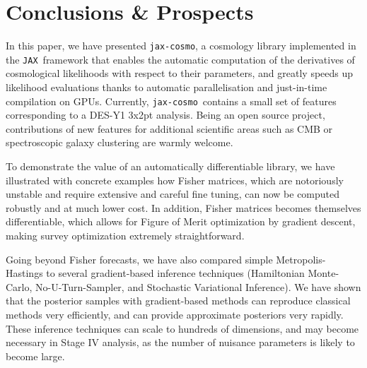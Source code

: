 \documentclass[twocolumn,twocolappendix,nofootinbib,iop]{openjournal}
\newcommand{\jaxcosmo}{\texttt{jax-cosmo}}
\newcommand{\jax}{\texttt{JAX}}
\begin{document}
\section{Conclusions \& Prospects}
\label{sec-conclusion}

In this paper, we have presented \jaxcosmo, a cosmology library implemented in the \jax\ framework that enables the automatic computation of the derivatives of cosmological likelihoods with respect to their parameters, and greatly speeds up likelihood evaluations thanks to automatic parallelisation and just-in-time compilation on GPUs. Currently, \jaxcosmo\ contains a small set of features corresponding to a DES-Y1 3x2pt analysis. Being an open source project, contributions of new features for additional scientific areas such as CMB or spectroscopic galaxy clustering are warmly welcome. 

To demonstrate the value of an automatically differentiable library, we have illustrated with concrete examples how Fisher matrices, which are notoriously unstable and require extensive and careful fine tuning, can now be computed robustly and at much lower cost. In addition, Fisher matrices becomes themselves differentiable, which allows for  Figure of Merit optimization by gradient descent, making survey optimization extremely straightforward. 

Going beyond Fisher forecasts, we have also compared simple Metropolis-Hastings to several gradient-based inference techniques (Hamiltonian Monte-Carlo, No-U-Turn-Sampler, and Stochastic Variational Inference). We have shown that the posterior samples with gradient-based methods can reproduce classical methods very efficiently, and can provide approximate posteriors very rapidly. These inference techniques can scale to hundreds of dimensions, and may become necessary in Stage IV analysis, as the number of nuisance parameters is likely to become large.
\end{document}
